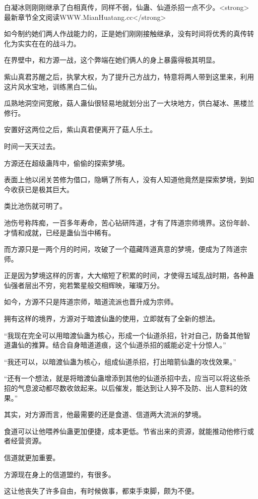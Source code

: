 \begin{this_body}
白凝冰则刚刚继承了白相真传，同样不弱，仙蛊、仙道杀招一点不少。<strong>最新章节全文阅读WWW.MianHuatang.cc</strong>

如今制约她们两人作战能力的，正是她们刚刚接触继承，没有时间将优秀的真传转化为实实在在的战斗力。

在界壁中，和方源一战，这个弊端在她们俩人的身上暴露得极其明显。

紫山真君苏醒之后，执掌大权，为了提升己方战力，特意将两人带到这里来，利用这片风水宝地，训练黑白二仙。

瓜熟地洞空间宽敞，菇人蛊仙很轻易地就划分出了一大块地方，供白凝冰、黑楼兰修行。

安置好这两位之后，紫山真君便离开了菇人乐土。

时间一天天过去。

方源还在超级蛊阵中，偷偷的探索梦境。

表面上他以闭关苦修为借口，隐瞒了所有人，没有人知道他竟然是探索梦境，到如今收获已是极其巨大。

类比池伤就可明了。

池伤号称阵痴，一百多年寿命，苦心钻研阵道，才有了阵道宗师境界。这份年龄、才情和成就，已经是蛊仙当中稀有。

而方源只是一两个月的时间，攻破了一个蕴藏阵道真意的梦境，便成为了阵道宗师。

正是因为梦境这样的厉害，大大缩短了积累的时间，才使得五域乱战时期，各种蛊仙强者层出不穷，宛若繁星般交相辉映，璀璨万分。

如今，方源不只是阵道宗师，暗道流派也晋升成为宗师。

拥有这样的境界，方源对于暗渡仙蛊的使用，立即就有了全新的想法。

“我现在完全可以用暗渡仙蛊为核心，形成一个仙道杀招，针对自己，防备其他智道蛊仙的推算。结合自身暗道道痕，这个仙道杀招的威能必定十分惊人。”

“我还可以，以暗渡仙蛊为核心，组成仙道杀招，打出暗箭仙蛊的攻伐效果。”

“还有一个想法，就是将暗渡仙蛊增添到其他的仙道杀招中去，应当可以将这些杀招的气息波动都尽数收敛起来。以后催发，能达到让人猝不及防、出人意料的效果。”

其实，对方源而言，他最需要的还是食道、信道两大流派的梦境。

食道可以让他喂养仙蛊更加便捷，成本更低。节省出来的资源，就能推动他修行或者经营资源。

信道就更加重要。

方源现在身上的信道盟约，有很多。

这让他丧失了许多自由，有时候做事，都束手束脚，颇为不便。


\end{this_body}
